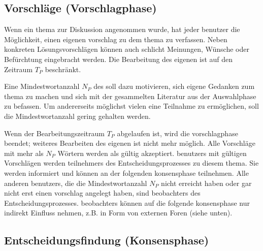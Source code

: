 \documentclass[10pt]{article}
\begin{document}
\subsection{Vorschläge (Vorschlagphase)}

Wenn ein \gls{thema} zur Diskussion angenommen wurde, hat jeder \gls{benutzer} die Möglichkeit, einen eigenen \gls{vorschlag} zu dem \gls{thema} zu verfassen. Neben konkreten Lösungsvorschlägen können auch schlicht Meinungen, Wünsche oder Befürchtung eingebracht werden. Die Bearbeitung des eigenen  ist auf den Zeitraum $T_P$ beschränkt.

Eine Mindestwortanzahl $N_P$ des  soll dazu motivieren, sich eigene Gedanken zum \gls{thema} zu machen und sich mit der gesammelten Literatur aus der Auswahlphase zu befassen. Um andererseits möglichst vielen  eine Teilnahme zu ermöglichen, soll die Mindestwortanzahl gering gehalten werden.

Wenn der Bearbeitungszeitraum $T_P$ abgelaufen ist, wird die \gls{vorschlagphase} beendet; weiteres Bearbeiten des eigenen  ist nicht mehr möglich. Alle Vorschläge mit mehr als $N_P$ Wörtern werden als gültig akzeptiert. \glspl{benutzer} mit gültigen Vorschlägen werden \glspl{teilnehmer} des Entscheidungsprozesses zu diesem \gls{thema}. Sie werden informiert und können an der folgenden \gls{konsensphase} teilnehmen. Alle anderen \glspl{benutzer}, die die Mindestwortanzahl $N_P$ nicht erreicht haben oder gar nicht erst einen \gls{vorschlag} angelegt haben, sind \glspl{beobachter} des Entscheidungsprozesses. \glspl{beobachter} können auf die folgende \gls{konsensphase} nur indirekt Einfluss nehmen, z.B. in Form von externen Foren (siehe unten).

\subsection{Entscheidungsfindung (Konsensphase)}
\end{document}
